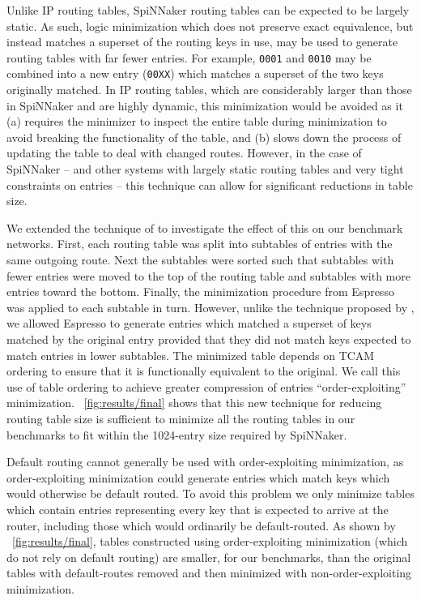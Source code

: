 \documentclass[conference]{IEEEtran}
\newcommand{\mytt}[1]{\texttt{\footnotesize#1}}
\begin{document}
Unlike IP routing tables, SpiNNaker routing tables can be expected to be largely static.
As such, logic minimization which does not preserve exact equivalence, but instead matches a superset of the routing keys in use, may be used to generate routing tables with far fewer entries.
For example, \mytt{0001} and \mytt{0010} may be combined into a new entry (\mytt{00XX}) which matches a superset of the two keys originally matched.
In IP routing tables, which are considerably larger than those in SpiNNaker and are highly dynamic, this minimization would be avoided as it (a) requires the minimizer to inspect the entire table during minimization to avoid breaking the functionality of the table,
and (b) slows down the process of updating the table to deal with changed routes.
However, in the case of SpiNNaker -- and other systems with largely static routing tables and very tight constraints on entries -- this technique can allow for significant reductions in table size.

We extended the technique of \textcite{Liu2002} to investigate the effect of this on our benchmark networks.
First, each routing table was split into subtables of entries with the same outgoing route.
Next the subtables were sorted such that subtables with fewer entries were moved to the top of the routing table and subtables with more entries toward the bottom.
Finally, the minimization procedure from Espresso was applied to each subtable in turn.
However, unlike the technique proposed by \textcite{Liu2002}, we allowed Espresso to generate entries which matched a superset of keys matched by the original entry provided that they did not match keys expected to match entries in lower subtables.
The minimized table depends on TCAM ordering to ensure that it is functionally equivalent to the original.
We call this use of table ordering to achieve greater compression of entries ``order-exploiting'' minimization.
\figurename~\ref{fig:results/final} shows that this new technique for reducing routing table size is sufficient to minimize all the routing tables in our benchmarks to fit within the 1024-entry size required by SpiNNaker.

Default routing cannot generally be used with order-exploiting minimization, as order-exploiting minimization could generate entries which match keys which would otherwise be default routed.
To avoid this problem we only minimize tables which contain entries representing every key that is expected to arrive at the router, including those which would ordinarily be default-routed.
As shown by \figurename~\ref{fig:results/final}, tables constructed using order-exploiting minimization (which do not rely on default routing) are smaller, for our benchmarks, than the original tables with default-routes removed and then minimized with non-order-exploiting minimization.
\end{document}
